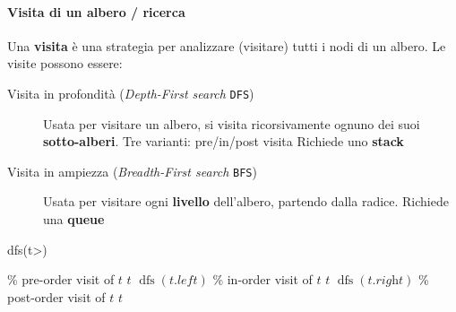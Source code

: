         \paragraph{Visita di un albero / ricerca} Una \textbf{visita} è una strategia per analizzare (visitare) tutti i nodi di un albero. Le visite possono essere:
        \begin{description}
            \item[Visita in profondità (\textit{Depth-First search} \texttt{DFS})] Usata per visitare un albero, si visita ricorsivamente ognuno dei suoi \textbf{sotto-alberi}.
                \subitem Tre varianti: pre/in/post visita
                \subitem Richiede uno \textbf{stack}
            \item[Visita in ampiezza (\textit{Breadth-First search} \texttt{BFS})] Usata per visitare ogni \textbf{livello} dell'albero, partendo dalla radice.
                \subitem Richiede una \textbf{queue}
        \end{description}
        \begin{algorithm}[H]
            \caption{dfs(\Tree t>)}
            \begin{algorithmic}
                    \State \% pre-order visit of $t$
                    \State \Print $t$
                    \State $\operatorname{dfs}(t.\textit{left})$
                    \State \% in-order visit of $t$
                    \State \Print $t$
                    \State $\operatorname{dfs}(t.\textit{right})$
                    \State \% post-order visit of $t$
                    \State \Print $t$
                \EndIf
            \end{algorithmic}
        \end{algorithm}
